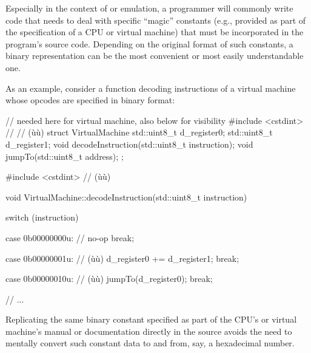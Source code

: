 Especially in the context of  or emulation,
a programmer will commonly write code that needs to deal
with specific ``magic'' constants (e.g., provided as part of the
specification of a CPU or virtual machine) that must be incorporated in
the program's source code. Depending on the original format of such
constants, a binary representation can be the most convenient or most
easily understandable one.

As an example, consider a function decoding instructions of a virtual
machine whose opcodes are specified in binary format:

%
%
%
%
\begin{emcppshiddenlisting}[emcppsbatch=e2]
// needed here for virtual machine, also below for visibility
#include <cstdint>  // // (ù{}ù)
struct VirtualMachine {
    std::uint8_t d_register0;
    std::uint8_t d_register1;
    void decodeInstruction(std::uint8_t instruction);
    void jumpTo(std::uint8_t address);
};
\end{emcppshiddenlisting}
\begin{emcppslisting}[emcppsbatch=e2]
#include <cstdint>  // (ù{}ù)

void VirtualMachine::decodeInstruction(std::uint8_t instruction)
{
    switch (instruction)
    {
        case 0b00000000u:  // no-op
            break;

        case 0b00000001u:  // (ù{}ù)
            d_register0 += d_register1;
            break;

        case 0b00000010u:  // (ù{}ù)
            jumpTo(d_register0);
            break;

        // ...
    }
}
\end{emcppslisting}

\noindent Replicating the same binary constant specified as part of the CPU's or
virtual machine's manual or documentation directly in the source avoids the need to
mentally convert such constant data to and from, say, a hexadecimal
number.

